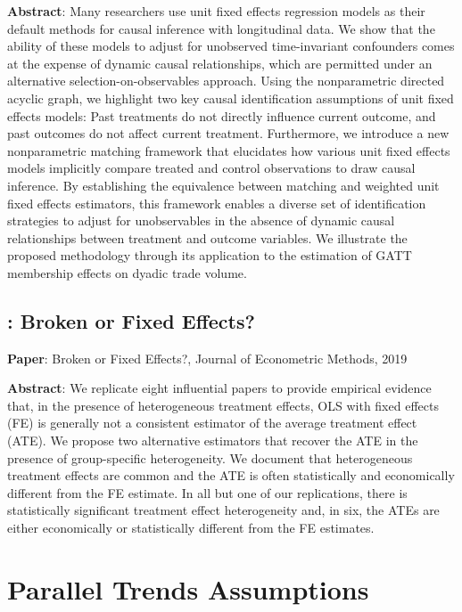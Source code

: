 \documentclass[12pt]{article}
\theoremstyle{definition}
\begin{document}
{\bf Abstract}: Many researchers use unit fixed effects regression models as their default methods for causal inference with longitudinal data. We show that the ability of these models to adjust for unobserved time-invariant confounders comes at the expense of dynamic causal relationships, which are permitted under an alternative selection-on-observables approach. Using the nonparametric directed acyclic graph, we highlight two key causal identification assumptions of unit fixed effects models: Past treatments do not directly influence current outcome, and past outcomes do not affect current treatment. Furthermore, we introduce a new nonparametric matching framework that elucidates how various unit fixed effects models implicitly compare treated and control observations to draw causal inference. By establishing the equivalence between matching and weighted unit fixed effects estimators, this framework enables a diverse set of identification strategies to adjust for unobservables in the absence of dynamic causal relationships between treatment and outcome variables. We illustrate the proposed methodology through its application to the estimation of GATT membership effects on dyadic trade volume.

\subsection{\citet{gibbonsBrokenFixedEffects2019a}: Broken or Fixed Effects?}

{\bf Paper}: Broken or Fixed Effects?, Journal of Econometric Methods, 2019

{\bf Abstract}: We replicate eight influential papers to provide empirical evidence that, in the presence of heterogeneous treatment effects, OLS with fixed effects (FE) is generally not a consistent estimator of the average treatment effect (ATE). We propose two alternative estimators that recover the ATE in the presence of group-specific heterogeneity. We document that heterogeneous treatment effects are common and the ATE is often statistically and economically different from the FE estimate. In all but one of our replications, there is statistically significant treatment effect heterogeneity and, in six, the ATEs are either economically or statistically different from the FE estimates.

\section{Parallel Trends Assumptions}
\end{document}
